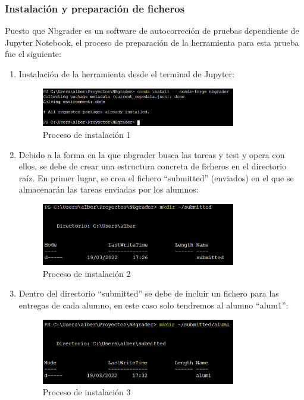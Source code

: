 \subsubsection{Instalación y preparación de ficheros}

Puesto que Nbgrader es un software de autocorreción de pruebas dependiente de Jupyter Notebook, el proceso de preparación de la herramienta para esta prueba fue el siguiente:

\begin{enumerate}
\item Instalación de la herramienta desde el terminal de Jupyter:

\begin{figure}[H]
    \centering
    \includegraphics[width=0.8\textwidth]{img/instal/instal_1.png}
    \caption{Proceso de instalación 1}
\end{figure}

\item Debido a la forma en la que nbgrader busca las tareas y test y opera con ellos, se debe de crear una estructura concreta de ficheros en el directorio raíz. En primer lugar, se crea el fichero “submitted” (enviados) en el que se almacenarán las tareas enviadas por los alumnos:

\begin{figure}[H]
    \centering
    \includegraphics[width=0.8\textwidth]{img/instal/instal_2.png}
    \caption{Proceso de instalación 2}
\end{figure}

\item Dentro del directorio “submitted” se debe de incluir un fichero para las entregas de cada alumno, en este caso solo tendremos al alumno “alum1”:

\begin{figure}[H]
    \centering
    \includegraphics[width=0.8\textwidth]{img/instal/instal_3.png}
    \caption{Proceso de instalación 3}
\end{figure}


\end{enumerate}
